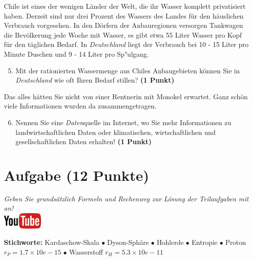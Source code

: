\documentclass[a4paper, 9pt]{scrartcl}\usepackage[]{graphicx}\usepackage[]{xcolor}
\begin{document}
Chile ist eines der wenigen Länder der Welt, die ihr Wasser komplett privatisiert haben. Derzeit sind nur drei Prozent des Wassers des Landes für den häuslichen Verbrauch vorgesehen. In den Dörfern der Anbauregionen versorgen Tankwagen die Bevölkerung jede Woche mit Wasser, es gibt etwa 55 Liter Wasser pro Kopf für den täglichen Bedarf. In \textit{Deutschland} liegt der Verbrauch bei 10 - 15 Liter pro Minute Duschen und 9 - 14 Liter pro Sp{"u}lgang.

\begin{enumerate}
  \setcounter{enumi}{4}
\item Mit der rationierten Wassermenge aus Chiles Anbaugebieten können Sie in \textit{Deutschland} wie oft Ihren Bedarf stillen? \textbf{(1 Punkt)}
\end{enumerate}

Das alles hätten Sie nicht von einer Rentnerin mit Monokel erwartet. Ganz schön viele Informationen wurden da zusammengetragen.

\begin{enumerate}
  \setcounter{enumi}{5}  
  \item Nennen Sie eine \textit{Daten}quelle im Internet, wo Sie mehr Informationen zu landwirtschaftlichen Daten oder klimatischen, wirtschaftlichen und gesellschaftlichen Daten erhalten! \textbf{(1 Punkt)}
\end{enumerate} 
\clearpage

\section{Aufgabe \hfill (12 Punkte)}

\textit{Geben Sie grunds{\"a}tzlich Formeln und Rechenweg zur L{\"o}sung der
  Teilaufgaben mit an!} \\[1Ex]

\hfill\href{https://youtu.be/WZSxntiNF8s}{\includegraphics[width = 2cm]{img/youtube}} %
\hspace{2Ex}

{\tiny\textbf{Stichworte:} Kardaschow-Skala $\bullet$ Dyson-Sphäre $\bullet$ Hohlerde $\bullet$ Entropie $\bullet$ Proton $r_P = 1.7 \times 10e-15$ $\bullet$ Wasserstoff $r_H = 5.3\times 10e-11$}
\end{document}
